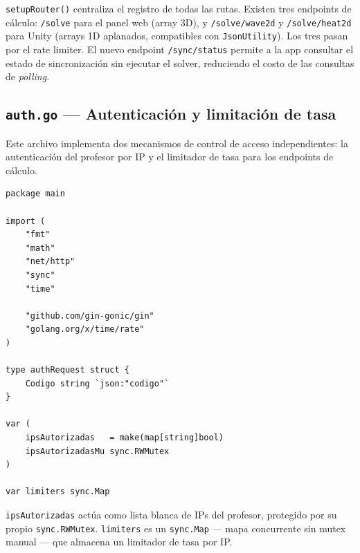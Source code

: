 \documentclass[12pt, a4paper]{article}
\begin{document}
\texttt{setupRouter()} centraliza el registro de todas las rutas. Existen tres
endpoints de cálculo: \texttt{/solve} para el panel web (array 3D), y
\texttt{/solve/wave2d} y \texttt{/solve/heat2d} para Unity (arrays 1D aplanados,
compatibles con \texttt{JsonUtility}). Los tres pasan por el rate limiter.
El nuevo endpoint \texttt{/sync/status} permite a la app consultar el estado de
sincronización sin ejecutar el solver, reduciendo el costo de las consultas de
\textit{polling}.

\subsection{\texttt{auth.go} — Autenticación y limitación de tasa}

Este archivo implementa dos mecanismos de control de acceso independientes: la
autenticación del profesor por IP y el limitador de tasa para los endpoints de cálculo.

\begin{lstlisting}[style=golang, caption={\texttt{auth.go} — imports y variables globales}]
package main

import (
    "fmt"
    "math"
    "net/http"
    "sync"
    "time"

    "github.com/gin-gonic/gin"
    "golang.org/x/time/rate"
)

type authRequest struct {
    Codigo string `json:"codigo"`
}

var (
    ipsAutorizadas   = make(map[string]bool)
    ipsAutorizadasMu sync.RWMutex
)

var limiters sync.Map
\end{lstlisting}

\texttt{ipsAutorizadas} actúa como lista blanca de IPs del profesor, protegido por su
propio \texttt{sync.RWMutex}. \texttt{limiters} es un \texttt{sync.Map} — mapa
concurrente sin mutex manual — que almacena un limitador de tasa por IP.
\end{document}
